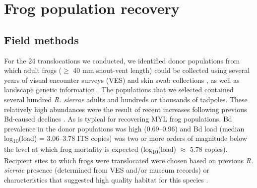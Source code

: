 \documentclass[9pt,twocolumn,twoside,lineno]{pnas-new}
\begin{document}
{\hypertarget{frog-population-recovery-1}{%
\section*{Frog population recovery}\label{frog-population-recovery-1}}

\hypertarget{field-methods}{%
\subsection*{Field methods}\label{field-methods}}

For the 24 translocations we conducted, we identified donor populations
from which adult frogs (\(\geq\) 40 mm snout-vent length) could be
collected using several years of visual encounter surveys (VES) and skin
swab collections \citep{knapp2016}, as well as landscape genetic
information \citep{poorten2017}. The populations that we selected
contained several hundred \emph{R. sierrae} adults and hundreds or
thousands of tadpoles. These relatively high abundances were the result
of recent increases following previous Bd-caused declines
\citep{knapp2016}. As is typical for recovering MYL frog populations, Bd
prevalence in the donor populations was high (0.69--0.96) and Bd load
(median log\textsubscript{10}(load) = 3.06--3.78 ITS copies) was two or
more orders of magnitude below the level at which frog mortality is
expected (log\textsubscript{10}(load) \(\approx\) 5.78
copies)\citep{vredenburg2010, joseph2018}. Recipient sites to which
frogs were translocated were chosen based on previous \emph{R. sierrae}
presence (determined from VES and/or museum records) or characteristics
that suggested high quality habitat for this species \citep{knapp2005}.

}
\end{document}
